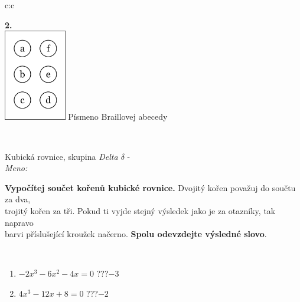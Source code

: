 \documentclass[10pt]{report}
\begin{document}
\begin{tabular}{c:c}
\begin{minipage}[c][104.5mm][t]{0.5\linewidth}
\begin{center}
\begin{minipage}{0.79\linewidth}
\begin{center}
\begin{varwidth}{\linewidth}
\begin{enumerate}
\end{enumerate}
\end{varwidth}
\end{center}
\end{minipage}
\begin{minipage}{0.20\linewidth}
\begin{center}
{\Huge\bfseries 2.} \\[2mm]
\includegraphics[height=40mm]{../images/braille.png}
{\small Písmeno Braillovej abecedy}
\end{center}
\end{minipage}
\end{center}
\end{minipage}
\\ \hdashline
\begin{minipage}[c][104.5mm][t]{0.5\linewidth}
\begin{center}
\vspace{7mm}
{\huge Kubická rovnice, skupina \textit{Delta $\delta$} -}\\[5mm]
\textit{Meno:}\phantom{xxxxxxxxxxxxxxxxxxxxxxxxxxxxxxxxxxxxxxxxxxxxxxxxxxxxxxxxxxxxxxxxx}\\[5mm]
\begin{minipage}{0.95\linewidth}
\textbf{Vypočítej součet kořenů kubické rovnice.} Dvojitý kořen považuj do součtu za dva,\\trojitý kořen za tři. Pokud ti vyjde stejný výsledek jako je za otazníky, tak napravo\\barvi příslušející kroužek načerno. \textbf{Spolu odevzdejte výsledné slovo}.
\end{minipage}
\\[1mm]
\begin{minipage}{0.79\linewidth}
\begin{center}
\begin{varwidth}{\linewidth}
\begin{enumerate}
\Large
\item $-2x^3-6x^2-4x=0$\quad \dotfill\; ???\;\dotfill \quad $-3$
\item $4x^3-12x+8=0$\quad \dotfill\; ???\;\dotfill \quad $-2$

\end{enumerate}
\end{varwidth}
\end{center}
\end{minipage}
\end{center}
\end{minipage}
\end{tabular}
\end{document}

